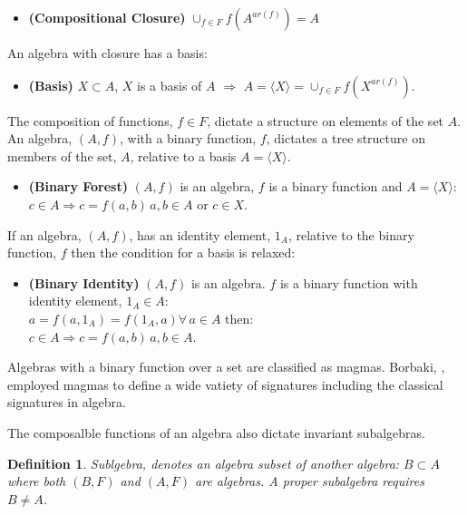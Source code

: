 \documentclass[aps,twocolumn,secnumarabic,nobalancelastpage,amsmath,amssymb,
amsthm,nofootinbib,parskip=full]{revtex4}
\newtheorem{definition}{Definition}[section]
\begin{document}
\begin{itemize}
\item \textbf{\small (Compositional Closure)}
  $\cup_{f\in F}f(A^{ar(f)})=A$
\end{itemize}

An algebra with closure has a basis:

\begin{itemize}
\item \textbf{\small (Basis)}
  $X\subset A$, $X$ is a basis of $A$ $\Rightarrow$ $A=\langle X\rangle=\cup_{f\in F}f(X^{ar(f)})$.
\end{itemize}

The composition of functions, $f\in F$, dictate a structure on elements of the set $A$.
An algebra, $(A,f)$, with
a binary function, $f$, dictates a tree structure on members of the set,
$A$, relative to a basis $A=\langle X\rangle$.

\begin{itemize}
\item \textbf{\small (Binary Forest)}
  $(A,f)$ is an algebra, $f$ is a binary function and $A=\langle X\rangle$:
  $c\in A\Rightarrow c=f(a,b)\,a,b\in A$ or $c\in X$.
\end{itemize}



If an algebra, $(A,f)$, has an identity element, $1_A$, relative to the binary
function, $f$ then the condition for a basis is relaxed:

\begin{itemize}
\item \textbf{\small (Binary Identity)}
  $(A,f)$ is an algebra. $f$ is a binary function with identity element, $1_A\in A$: \\
  $a=f(a,1_A)=f(1_A,a)\forall\,a\in A$ then: \\
  $c\in A\Rightarrow c=f(a,b)\,a,b\in A$.
\end{itemize}

Algebras with a binary function over a set
are classified as magmas. Borbaki, \cite{bourbaki1989},
employed magmas to define a wide vatiety of signatures
including the classical signatures in algebra.

The composalble functions of an algebra also dictate invariant
subalgebras.

\begin{definition}{Sublgebra}\label{subalgebradef},
  denotes an algebra subset of another algebra:
  $B\subset A$ where both $(B,F)$ and $(A,F)$ are algebras.
  A proper subalgebra requires $B\neq A$.
\end{definition}
\end{document}
